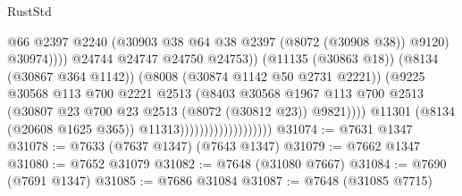 \begin{lexlean}{RustStd}
\begin{coremodule}
{\begin{coremodule}
{{{{{{{{{{{{{{{{{{{{{{{{{{{{{{{{{{{{{{{{{{{{{{{{{{{{{                                                        @66
                                                        @2397
                                                        @2240
                                                        (@30903
                                                          @38
                                                          @64
                                                          @38
                                                          @2397
                                                          (@8072 (@30908 @38))
                                                          @9120)
                                                        @30974))))
                                                @24744
                                                @24747
                                                @24750
                                                @24753))
                                            (@11135 (@30863 @18))
                                            (@8134 (@30867 @364 @1142))
                                            (@8008 (@30874 @1142 @50 @2731 @2221))
                                            (@9225
                                              @30568
                                              @113
                                              @700
                                              @2221
                                              @2513
                                              (@8403
                                                @30568
                                                @1967
                                                @113
                                                @700
                                                @2513
                                                (@30807
                                                  @23
                                                  @700
                                                  @23
                                                  @2513
                                                  (@8072 (@30812 @23))
                                                  @9821))))
                                          @11301
                                          (@8134 (@20608 @1625 @365))
                                          @11313)))))))))))))))))))
@31074 := @7631 @1347
@31078 := @7633 (@7637 @1347) (@7643 @1347)
@31079 := @7662 @1347
@31080 := @7652 @31079
@31082 := @7648 (@31080 @7667)
@31084 := @7690 (@7691 @1347)
@31085 := @7686 @31084
@31087 := @7648 (@31085 @7715)
}}}}}}}}}}}}}}}}}}}}}}}}}}}}}}}}}}}}}}}}}}}}}}}}}}}}}
\end{coremodule}}
\end{coremodule}
\end{lexlean}
